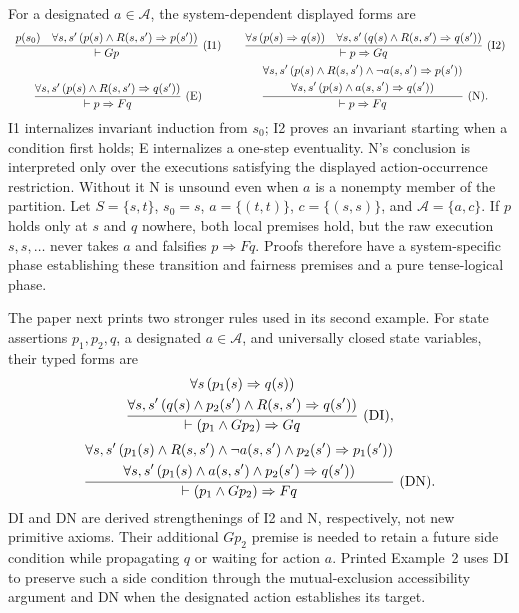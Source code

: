 For a designated \(a\in\mathcal A\), the system-dependent displayed forms are
\[
\begin{array}{c@{\qquad}c}
\displaystyle
\frac{p(s_0)\quad
       \forall s,s'\,
       (p(s)\land R(s,s')\Rightarrow p(s'))}
      {\vdash Gp}\ ({\rm I1})
&
\displaystyle
\frac{\forall s\,(p(s)\Rightarrow q(s))\quad
       \forall s,s'\,
       (q(s)\land R(s,s')\Rightarrow q(s'))}
      {\vdash p\Rightarrow Gq}\ ({\rm I2})
\\[2.4ex]
\displaystyle
\frac{\forall s,s'\,
       (p(s)\land R(s,s')\Rightarrow q(s'))}
      {\vdash p\Rightarrow Fq}\ ({\rm E})
&
\displaystyle
\frac{\begin{gathered}
       \forall s,s'\,
       (p(s)\land R(s,s')\land\neg a(s,s')\Rightarrow p(s'))\\
       \forall s,s'\,
       (p(s)\land a(s,s')\Rightarrow q(s'))
       \end{gathered}}
      {\vdash p\Rightarrow Fq}\ ({\rm N}).
\end{array}
\]
I1 internalizes invariant induction from \(s_0\); I2 proves an invariant
starting when a condition first holds; E internalizes a one-step eventuality.
N's conclusion is interpreted only over the executions satisfying the
displayed action-occurrence restriction.  Without it N is unsound even when
\(a\) is a nonempty member of the partition.  Let
\(S=\{s,t\}\), \(s_0=s\),
\(a=\{(t,t)\}\), \(c=\{(s,s)\}\), and
\(\mathcal A=\{a,c\}\).  If \(p\) holds only at \(s\) and \(q\) nowhere,
both local premises hold, but the raw execution
\(s,s,\ldots\) never takes \(a\) and falsifies \(p\Rightarrow Fq\).
Proofs therefore have a
system-specific phase establishing these transition and fairness premises and
a pure tense-logical phase.

The paper next prints two stronger rules used in its second example.  For state
assertions \(p_1,p_2,q\), a designated \(a\in\mathcal A\), and universally
closed state variables, their typed forms are
\[
\frac{\begin{gathered}
 \forall s\,(p_1(s)\Rightarrow q(s))\\
 \forall s,s'\,
 (q(s)\land p_2(s')\land R(s,s')\Rightarrow q(s'))
 \end{gathered}}
 {\vdash(p_1\land Gp_2)\Rightarrow Gq}\ ({\rm DI}),
\]
\[
\frac{\begin{gathered}
 \forall s,s'\,
 (p_1(s)\land R(s,s')\land\neg a(s,s')\land p_2(s')
    \Rightarrow p_1(s'))\\
 \forall s,s'\,
 (p_1(s)\land a(s,s')\land p_2(s')\Rightarrow q(s'))
 \end{gathered}}
 {\vdash(p_1\land Gp_2)\Rightarrow Fq}\ ({\rm DN}).
\]
DI and DN are derived strengthenings of I2 and N, respectively, not new
primitive axioms.  Their additional \(Gp_2\) premise is needed to retain a
future side condition while propagating \(q\) or waiting for action \(a\).
Printed Example~2 uses DI to preserve such a side condition through the
mutual-exclusion accessibility argument and DN when the designated action
establishes its target.

